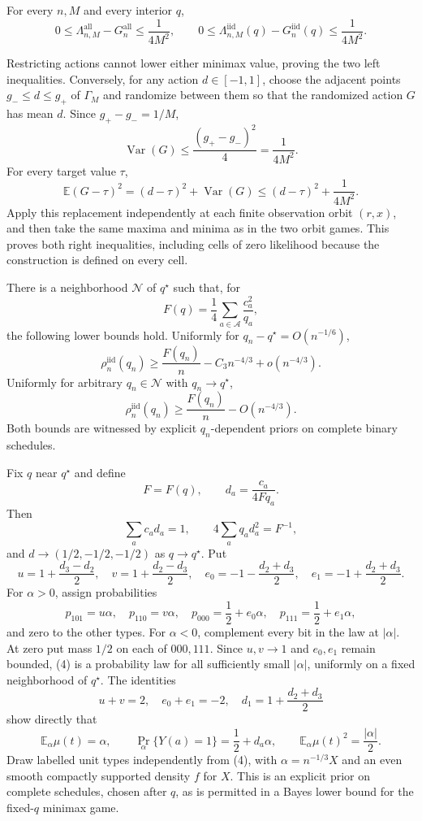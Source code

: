 For every \(n,M\) and every interior \(q\),
\[
0\leq\Lambda_{n,M}^{\mathrm{all}}-G_n^{\mathrm{all}}
\leq\frac1{4M^2},
\qquad
0\leq\Lambda_{n,M}^{\mathrm{iid}}(q)-G_n^{\mathrm{iid}}(q)
\leq\frac1{4M^2}.
\]

Restricting actions cannot lower either minimax value, proving the two left inequalities.  Conversely, for any action \(d\in[-1,1]\), choose the adjacent points \(g_-\leq d\leq g_+\) of \(\Gamma_M\) and randomize between them so that the randomized action \(G\) has mean \(d\).  Since \(g_+-g_-=1/M\),
\[
\operatorname{Var}(G)\leq\frac{(g_+-g_-)^2}{4}
=\frac1{4M^2}.
\]
For every target value \(\tau\),
\[
\mathbb E(G-\tau)^2=(d-\tau)^2+\operatorname{Var}(G)
\leq(d-\tau)^2+\frac1{4M^2}.
\]
Apply this replacement independently at each finite observation orbit \((r,x)\), and then take the same maxima and minima as in the two orbit games.  This proves both right inequalities, including cells of zero likelihood because the construction is defined on every cell.

There is a neighborhood \(\mathcal N\) of \(q^\star\) such that, for
\[
F(q)=\frac14\sum_{a\in\mathcal A}\frac{c_a^2}{q_a},
\]
the following lower bounds hold.  Uniformly for \(q_n-q^\star=O(n^{-1/6})\),
\[
\rho_n^{\mathrm{iid}}(q_n)
\geq \frac{F(q_n)}n-C_3n^{-4/3}+o(n^{-4/3}).
\]
Uniformly for arbitrary \(q_n\in\mathcal N\) with \(q_n\to q^\star\),
\[
\rho_n^{\mathrm{iid}}(q_n)\geq\frac{F(q_n)}n-O(n^{-4/3}).
\]
Both bounds are witnessed by explicit \(q_n\)-dependent priors on complete binary schedules.

Fix \(q\) near \(q^\star\) and define
\[
F=F(q),\qquad d_a=\frac{c_a}{4Fq_a}.
\]
Then
\[
\sum_ac_ad_a=1,\qquad
4\sum_aq_ad_a^2=F^{-1},
\]
and \(d\to(1/2,-1/2,-1/2)\) as \(q\to q^\star\).  Put
\[
u=1+\frac{d_3-d_2}{2},\quad
v=1+\frac{d_2-d_3}{2},\quad
e_0=-1-\frac{d_2+d_3}{2},\quad
e_1=-1+\frac{d_2+d_3}{2}.
\]
For \(\alpha>0\), assign probabilities
\[
p_{101}=u\alpha,\quad p_{110}=v\alpha,\quad
p_{000}=\frac12+e_0\alpha,\quad
p_{111}=\frac12+e_1\alpha,
\tag{4}
\]
and zero to the other types.  For \(\alpha<0\), complement every bit in the law at \(|\alpha|\).  At zero put mass \(1/2\) on each of \(000,111\).  Since \(u,v\to1\) and \(e_0,e_1\) remain bounded, (4) is a probability law for all sufficiently small \(|\alpha|\), uniformly on a fixed neighborhood of \(q^\star\).  The identities
\[
u+v=2,\quad e_0+e_1=-2,\quad
d_1=1+\frac{d_2+d_3}{2}
\]
show directly that
\[
\mathbb E_\alpha\mu(t)=\alpha,\qquad
\Pr_\alpha\{Y(a)=1\}=\frac12+d_a\alpha,\qquad
\mathbb E_\alpha\mu(t)^2=\frac{|\alpha|}{2}.
\tag{5}
\]
Draw labelled unit types independently from (4), with
\(\alpha=n^{-1/3}X\) and an even smooth compactly supported density \(f\) for \(X\).  This is an explicit prior on complete schedules, chosen after \(q\), as is permitted in a Bayes lower bound for the fixed-\(q\) minimax game.

